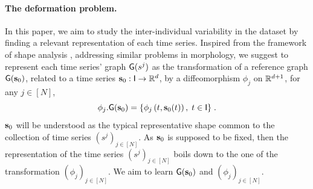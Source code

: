 \paragraph*{The deformation problem.}
In this paper, we aim to study the inter-individual variability in the dataset by finding a relevant representation of each time series.
Inspired from the framework of shape analysis \cite{vaillant2004statistics}, addressing similar problems in morphology,
 we suggest to represent each time series' graph $\mathsf{G}(s^j)$ as the transformation of a reference graph $\mathsf{G}(\mathbf{s}_0)$, related to a time series $\mathbf{s}_0:\mathsf{I} \to\mathbb{R}^d$, by a diffeomorphism $\phi_j$ on $\mathbb{R}^{d+1}$, for any $j\in[N]$,
\begin{equation}
 \label{eq:transformation}
 \phi_j.\mathsf{G}(\mathbf{s}_0)=\{\phi_j\left(t,\mathbf{s}_0(t)\right), \; t\in \mathsf{I} \} \;.
\end{equation}
$\mathbf{s}_0$ will be understood as the typical representative shape common to the collection of time series $(s^j)_{j\in[N]}$.
As $\mathbf{s}_0$ is supposed to be fixed, then the representation of the time series $(s^j)_{j\in[N]}$ boils down to the one of the transformation $(\phi_j)_{j\in[N]}$.
We aim to learn $\mathsf{G}(\mathbf{s}_0)$ and $(\phi_j)_{j\in[N]} $. 

 
 
